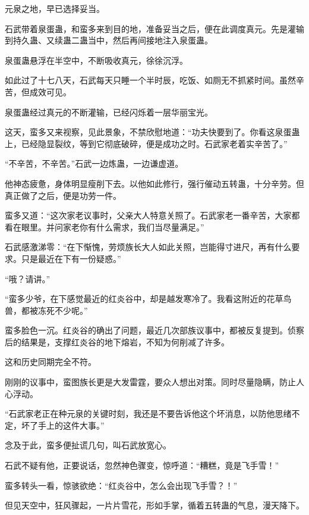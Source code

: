 
\begin{this_body}



元泉之地，早已选择妥当。

石武带着泉蛋蛊，和蛮多来到目的地，准备妥当之后，便在此调度真元。先是灌输到持久蛊、又续蛊二蛊当中，然后再间接地注入泉蛋蛊。

泉蛋蛊悬浮在半空中，不断吸收真元，徐徐沉浮。

如此过了十七八天，石武每天只睡一个半时辰，吃饭、如厕无不抓紧时间。虽然辛苦，但成效可见。

泉蛋蛊经过真元的不断灌输，已经闪烁着一层华丽宝光。

这天，蛮多又来视察，见此景象，不禁欣慰地道：“功夫快要到了。你看这泉蛋蛊上，已经隐显裂纹，等到它彻底破碎，便是成功之时。石武家老着实辛苦了。”

“不辛苦，不辛苦。”石武一边炼蛊，一边谦虚道。

他神态疲惫，身体明显瘦削下去。以他如此修行，强行催动五转蛊，十分辛劳。但真正做了之后，便是功劳一件。

蛮多又道：“这次家老议事时，父亲大人特意关照了。石武家老一番辛苦，大家都看在眼里。并问家老你有什么需求，我们当尽量满足。”

石武感激涕零：“在下惭愧，劳烦族长大人如此关照，岂能得寸进尺，再有什么要求。只是最近在下有一份疑惑。”

“哦？请讲。”

“蛮多少爷，在下感觉最近的红炎谷中，却是越发寒冷了。我看这附近的花草鸟兽，都被冻死不少呢。”

蛮多脸色一沉。红炎谷的确出了问题，最近几次部族议事中，都被反复提到。侦察后的结果是，支撑红炎谷的地下熔岩，不知为何削减了许多。

这和历史同期完全不符。

刚刚的议事中，蛮图族长更是大发雷霆，要众人想出对策。同时尽量隐瞒，防止人心浮动。

“石武家老正在种元泉的关键时刻，我还是不要告诉他这个坏消息，以防他思绪不定，坏了手上的这件大事。”

念及于此，蛮多便扯谎几句，叫石武放宽心。

石武不疑有他，正要说话，忽然神色骤变，惊呼道：“糟糕，竟是飞手雪！”

蛮多转头一看，惊骇欲绝：“红炎谷中，怎么会出现飞手雪？！”

但见天空中，狂风骤起，一片片雪花，形如手掌，循着五转蛊的气息，漫天降下。


\end{this_body}

